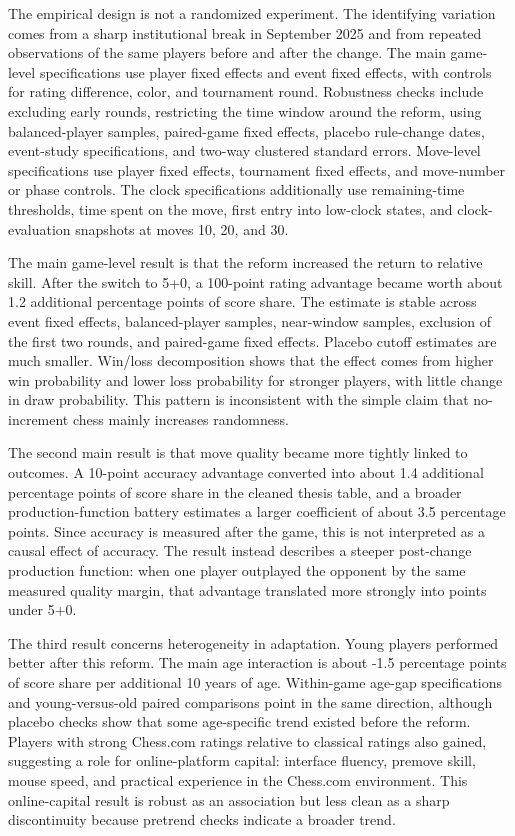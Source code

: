 The empirical design is not a randomized experiment. The identifying variation comes from a sharp institutional break in September 2025 and from repeated observations of the same players before and after the change. The main game-level specifications use player fixed effects and event fixed effects, with controls for rating difference, color, and tournament round. Robustness checks include excluding early rounds, restricting the time window around the reform, using balanced-player samples, paired-game fixed effects, placebo rule-change dates, event-study specifications, and two-way clustered standard errors. Move-level specifications use player fixed effects, tournament fixed effects, and move-number or phase controls. The clock specifications additionally use remaining-time thresholds, time spent on the move, first entry into low-clock states, and clock-evaluation snapshots at moves 10, 20, and 30.

The main game-level result is that the reform increased the return to relative skill. After the switch to 5+0, a 100-point rating advantage became worth about 1.2 additional percentage points of score share. The estimate is stable across event fixed effects, balanced-player samples, near-window samples, exclusion of the first two rounds, and paired-game fixed effects. Placebo cutoff estimates are much smaller. Win/loss decomposition shows that the effect comes from higher win probability and lower loss probability for stronger players, with little change in draw probability. This pattern is inconsistent with the simple claim that no-increment chess mainly increases randomness.

The second main result is that move quality became more tightly linked to outcomes. A 10-point accuracy advantage converted into about 1.4 additional percentage points of score share in the cleaned thesis table, and a broader production-function battery estimates a larger coefficient of about 3.5 percentage points. Since accuracy is measured after the game, this is not interpreted as a causal effect of accuracy. The result instead describes a steeper post-change production function: when one player outplayed the opponent by the same measured quality margin, that advantage translated more strongly into points under 5+0.

The third result concerns heterogeneity in adaptation. Young players performed better after this reform. The main age interaction is about -1.5 percentage points of score share per additional 10 years of age. Within-game age-gap specifications and young-versus-old paired comparisons point in the same direction, although placebo checks show that some age-specific trend existed before the reform. Players with strong Chess.com ratings relative to classical ratings also gained, suggesting a role for online-platform capital: interface fluency, premove skill, mouse speed, and practical experience in the Chess.com environment. This online-capital result is robust as an association but less clean as a sharp discontinuity because pretrend checks indicate a broader trend.

